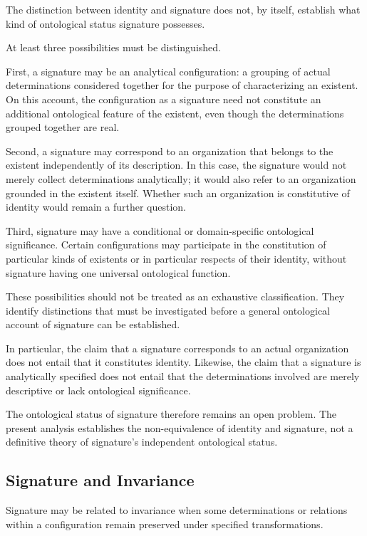 The distinction between identity and signature does
not, by itself, establish what kind of ontological
status signature possesses.

At least three possibilities must be distinguished.

First, a signature may be an analytical configuration:
a grouping of actual determinations considered together
for the purpose of characterizing an existent. On this
account, the configuration as a signature need not
constitute an additional ontological feature of the
existent, even though the determinations grouped
together are real.

Second, a signature may correspond to an organization
that belongs to the existent independently of its
description. In this case, the signature would not
merely collect determinations analytically; it would
also refer to an organization grounded in the existent
itself. Whether such an organization is constitutive
of identity would remain a further question.

Third, signature may have a conditional or domain-specific
ontological significance. Certain configurations may
participate in the constitution of particular kinds
of existents or in particular respects of their
identity, without signature having one universal
ontological function.

These possibilities should not be treated as an
exhaustive classification. They identify distinctions
that must be investigated before a general ontological
account of signature can be established.

In particular, the claim that a signature corresponds
to an actual organization does not entail that it
constitutes identity. Likewise, the claim that a
signature is analytically specified does not entail
that the determinations involved are merely descriptive
or lack ontological significance.

The ontological status of signature therefore remains
an open problem. The present analysis establishes
the non-equivalence of identity and signature, not
a definitive theory of signature's independent
ontological status.

\subsection{Signature and Invariance}

Signature may be related to invariance when some
determinations or relations within a configuration
remain preserved under specified transformations.

